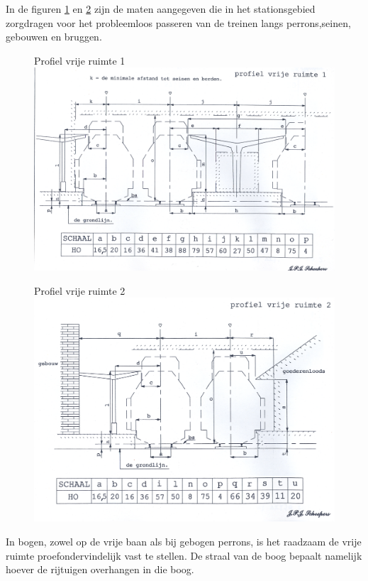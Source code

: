 \documentclass[12pt,a4paper]{report}
\begin{document}
In de figuren \ref{figuur15} en \ref{figuur16} zijn de maten aangegeven die in het stationsgebied zorgdragen voor het probleemloos passeren van de treinen langs perrons,seinen, gebouwen en bruggen.

\begin{figure}[!ht]
  \captionbox
  {Profiel vrije ruimte 1\label{figuur15}}
  {\includegraphics[scale=0.6]{images/rcu_figuur15}}
\end{figure}

\begin{figure}[!ht]
  \captionbox
  {Profiel vrije ruimte 2\label{figuur16}}
  {\includegraphics[scale=0.6]{images/rcu_figuur16}}
\end{figure}

In bogen, zowel op de vrije baan als bij gebogen perrons, is het raadzaam de vrije ruimte proefondervindelijk vast te stellen. De straal van de boog bepaalt namelijk hoever de rijtuigen overhangen in die boog.
\end{document}
